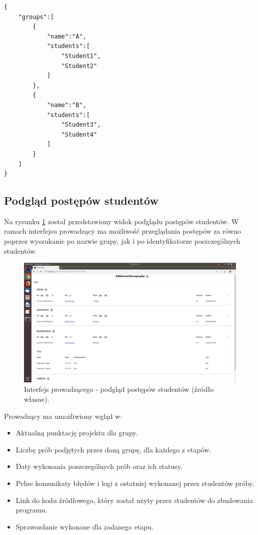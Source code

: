 {\selectfont
\footnotesize
\begin{lstlisting}
{
    "groups":[
        {
            "name":"A",
            "students":[
                "Student1",
                "Student2"
            ]
        },
        {
            "name":"B",
            "students":[
                "Student3",
                "Student4"
            ]
        }
    ]
}
\end{lstlisting}
}

\subsection{Podgląd postępów studentów}

Na rysunku \ref{fig:lecturer-interface-view} został przedstawiony widok podglądu postępów studentów.
W ramach interfejsu prowadzący ma możliwość przeglądania postępów za równo poprzez wyszukanie po nazwie grupy, jak i po identyfikatorze poszczególnych studentów.

\begin{figure}[h]
    \centering
    \includegraphics[width = 13cm]{chapter03/lecturer_interface_view.png}
    \caption{Interfejs prowadzącego - podgląd postępów studentów (źródło własne).}
    \label{fig:lecturer-interface-view}
\end{figure}

Prowadzący ma umożliwiony wgląd w:
\begin {itemize}
    \item Aktualną punktację projektu dla grupy.
    \item Liczbę prób podjętych przez daną grupę, dla każdego z etapów.
    \item Daty wykonania poszczególnych prób oraz ich statusy.
    \item Pełne komunikaty błędów i logi z ostatniej wykonanej przez studentów próby.
    \item Link do kodu źródłowego, który został użyty przez studentów do zbudowania programu.
    \item Sprawozdanie wykonane dla zadanego etapu.
\end {itemize}

